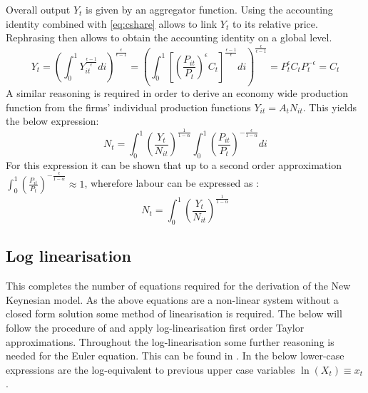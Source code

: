 \documentclass[12pt,a4paper,english]{article} %
\begin{document}
	Overall output $Y_t$ is given by an aggregator function. Using the accounting identity combined with \eqref{eq:cshare} allows to link $Y_t$ to its relative price. Rephrasing then allows to obtain the accounting identity on a global level. 	
	\begin{equation}
			Y_t = 
			\left( 
				\int_{0}^{1} Y_{it}^{\frac{\epsilon - 1}{\epsilon}} di 
			\right)^{\frac{\epsilon}{\epsilon - 1}}
			=
			\left( 
			\int_{0}^{1} 
			\left[
			\left( \frac{P_{it}}{P_t} \right)^\epsilon C_t
			\right]^{\frac{\epsilon - 1}{\epsilon}} di 
			\right)^{\frac{\epsilon}{\epsilon - 1}}
			=
			P_t^{\epsilon} C_t P_t^{-\epsilon}
			=
			C_t
	\end{equation}
	A similar reasoning is required in order to derive an economy wide production function from the firms' individual production functions $Y_{it} = A_t N_{it}$. This yields the below expression:
	\begin{equation}
		N_t = 	
		\int_{0}^{1} \left( \frac{Y_t}{N_{it}} \right)^{\frac{1}{1 - \alpha}}
		\int_{0}^{1} \left( \frac{P_{it}}{P_t} \right)^{-\frac{\epsilon}{1 - \alpha}} di
	\end{equation}
	For this expression it can be shown that up to a second order approximation $\int_{0}^{1} \left( \frac{P_{it}}{P_t} \right)^{-\frac{\epsilon}{1 - \alpha}} \approx 1$, wherefore labour can be expressed as \cite{gali_monetary_2008}:
	\begin{equation}\label{eq: Nt}
		N_t = \int_{0}^{1} \left( \frac{Y_t}{N_{it}} \right)^{\frac{1}{1 - \alpha}}
	\end{equation}
	
	\subsection{Log linearisation} \label{nk_log_lin}
	This completes the number of equations required for the derivation of the New Keynesian model. As the above equations are a non-linear system without a closed form solution some method of linearisation is required. The below will follow the procedure of \cite{gali_monetary_2008} and apply log-linearisation first order Taylor approximations. Throughout the log-linearisation some further reasoning is needed for the Euler equation. This can be found in . In the below lower-case expressions are the log-equivalent to previous upper case variables $\ln(X_t) \equiv x_t$.\\
		
\end{document}
